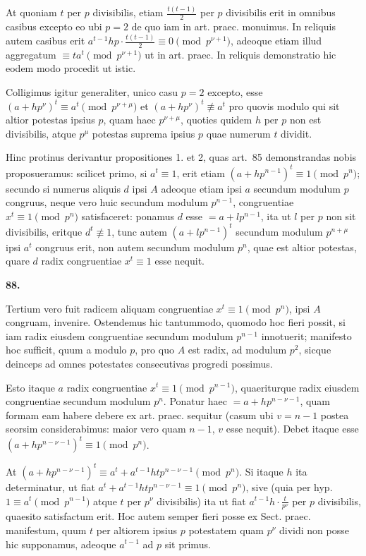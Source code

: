 \documentclass[12pt,a4paper]{article}
\theoremstyle{plain}
\theoremstyle{definition}
\theoremstyle{remark}
\begin{document}
At quoniam $t$ per $p$ divisibilis, etiam $\frac{t(t-1)}{2}$ per $p$ divisibilis erit in omnibus casibus excepto eo ubi $p=2$ de quo iam in art. praec. monuimus. In reliquis autem casibus erit $a^{t-1}hp \cdot \frac{t(t-1)}{2} \equiv 0 \pmod{p^{\nu+1}}$, adeoque etiam illud aggregatum $\equiv ta^t \pmod{p^{\nu+1}}$ ut in art. praec. In reliquis demonstratio hic eodem modo procedit ut istic.

Colligimus igitur generaliter, unico casu $p=2$ excepto, esse $(a+hp^\nu)^t \equiv a^t \pmod{p^{\nu+\mu}}$ et $(a+hp^\nu)^t \not\equiv a^t$ pro quovis modulo qui sit altior potestas ipsius $p$, quam haec $p^{\nu+\mu}$, quoties quidem $h$ per $p$ non est divisibilis, atque $p^\mu$ potestas suprema ipsius $p$ quae numerum $t$ dividit.

Hinc protinus derivantur propositiones 1. et 2, quas art.~85 demonstrandas nobis proposueramus: scilicet primo, si $a^t \equiv 1$, erit etiam $(a+hp^{n-1})^t \equiv 1 \pmod{p^n}$; secundo si numerus aliquis $d$ ipsi $A$ adeoque etiam ipsi $a$ secundum modulum $p$ congruus, neque vero huic secundum modulum $p^{n-1}$, congruentiae $x^t \equiv 1 \pmod{p^n}$ satisfaceret: ponamus $d$ esse $= a+lp^{n-1}$, ita ut $l$ per $p$ non sit divisibilis, eritque $d^t \not\equiv 1$, tunc autem $(a+lp^{n-1})^t$ secundum modulum $p^{n+\mu}$ ipsi $a^t$ congruus erit, non autem secundum modulum $p^n$, quae est altior potestas, quare $d$ radix congruentiae $x^t \equiv 1$ esse nequit.

\setcounter{satz}{88}
\addtocounter{satz}{-1}
\textbf{88.}

Tertium vero fuit radicem aliquam congruentiae $x^t \equiv 1 \pmod{p^n}$, ipsi $A$ congruam, invenire. Ostendemus hic tantummodo, quomodo hoc fieri possit, si iam radix eiusdem congruentiae secundum modulum $p^{n-1}$ innotuerit; manifesto hoc sufficit, quum a modulo $p$, pro quo $A$ est radix, ad modulum $p^2$, sicque deinceps ad omnes potestates consecutivas progredi possimus.

Esto itaque $a$ radix congruentiae $x^t \equiv 1 \pmod{p^{n-1}}$, quaeriturque radix eiusdem congruentiae secundum modulum $p^n$. Ponatur haec $= a+hp^{n-\nu-1}$, quam formam eam habere debere ex art. praec. sequitur (casum ubi $v=n-1$ postea seorsim considerabimus: maior vero quam $n-1$, $v$ esse nequit). Debet itaque esse $(a+hp^{n-\nu-1})^t \equiv 1 \pmod{p^n}$.

At $(a+hp^{n-\nu-1})^t \equiv a^t + a^{t-1}htp^{n-\nu-1} \pmod{p^n}$. Si itaque $h$ ita determinatur, ut fiat $a^t + a^{t-1}htp^{n-\nu-1} \equiv 1 \pmod{p^n}$, sive (quia per hyp. $1 \equiv a^t \pmod{p^{n-1}}$ atque $t$ per $p^\nu$ divisibilis) ita ut fiat $a^{t-1}h \cdot \frac{t}{p^\nu}$ per $p$ divisibilis, quaesito satisfactum erit. Hoc autem semper fieri posse ex Sect. praec. manifestum, quum $t$ per altiorem ipsius $p$ potestatem quam $p^\nu$ dividi non posse hic supponamus, adeoque $a^{t-1}$ ad $p$ sit primus.
\end{document}
